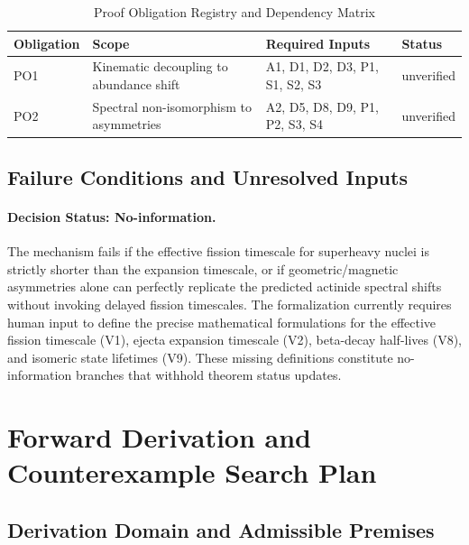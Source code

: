 \documentclass[conference]{IEEEtran}
\begin{document}
\begin{table}[htbp]
\centering
\footnotesize
\setlength{\tabcolsep}{3pt}
\renewcommand{\arraystretch}{1.12}
\caption{Proof Obligation Registry and Dependency Matrix}
\label{tab:definitions-and-propositions-po-registry}
\begin{tabular}{|p{}|p{}|p{}|p{}|}
\hline
Obligation & Scope & Required Inputs & Status \\\hline
PO1 & Kinematic decoupling to abundance shift & A1, D1, D2, D3, P1, S1, S2, S3 & unverified \\\hline
PO2 & Spectral non-isomorphism to asymmetries & A2, D5, D8, D9, P1, P2, S3, S4 & unverified \\\hline
\end{tabular}
\end{table}

\subsection{Failure Conditions and Unresolved Inputs}
\paragraph{Decision Status: No-information.} The mechanism fails if the effective fission timescale for superheavy nuclei is strictly shorter than the expansion timescale, or if geometric/magnetic asymmetries alone can perfectly replicate the predicted actinide spectral shifts without invoking delayed fission timescales. The formalization currently requires human input to define the precise mathematical formulations for the effective fission timescale (V1), ejecta expansion timescale (V2), beta-decay half-lives (V8), and isomeric state lifetimes (V9). These missing definitions constitute no-information branches that withhold theorem status updates.

\section{Forward Derivation and Counterexample Search Plan}
\subsection{Derivation Domain and Admissible Premises}
\end{document}
